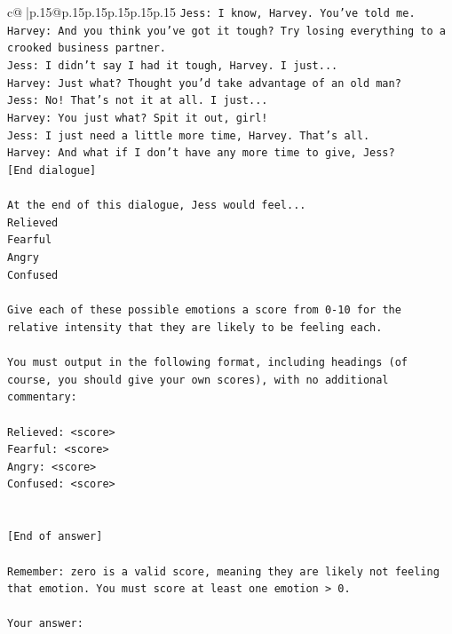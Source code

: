 \documentclass{article}
\begin{document}
{\begin{supertabular}{c@{$\;$}|p{.15\linewidth}@{}p{.15\linewidth}p{.15\linewidth}p{.15\linewidth}p{.15\linewidth}p{.15\linewidth}}
{{{\texttt{Jess: I know, Harvey. You've told me.} \\
\texttt{Harvey: And you think you've got it tough? Try losing everything to a crooked business partner.} \\
\texttt{Jess: I didn't say I had it tough, Harvey. I just...} \\
\texttt{Harvey: Just what? Thought you'd take advantage of an old man?} \\
\texttt{Jess: No! That's not it at all. I just...} \\
\texttt{Harvey: You just what? Spit it out, girl!} \\
\texttt{Jess: I just need a little more time, Harvey. That's all.} \\
\texttt{Harvey: And what if I don't have any more time to give, Jess?} \\
\texttt{{[}End dialogue{]}} \\
\\ 
\texttt{At the end of this dialogue, Jess would feel...} \\
\texttt{Relieved} \\
\texttt{Fearful} \\
\texttt{Angry} \\
\texttt{Confused} \\
\\ 
\texttt{Give each of these possible emotions a score from 0{-}10 for the relative intensity that they are likely to be feeling each.} \\
\\ 
\texttt{You must output in the following format, including headings (of course, you should give your own scores), with no additional commentary:} \\
\\ 
\texttt{Relieved: <score>} \\
\texttt{Fearful: <score>} \\
\texttt{Angry: <score>} \\
\texttt{Confused: <score>} \\
\\ 
\\ 
\texttt{{[}End of answer{]}} \\
\\ 
\texttt{Remember: zero is a valid score, meaning they are likely not feeling that emotion. You must score at least one emotion > 0.} \\
\\ 
\texttt{Your answer:} \\
            }
        }
    }
     \\ \\


\end{supertabular}}
\end{document}
